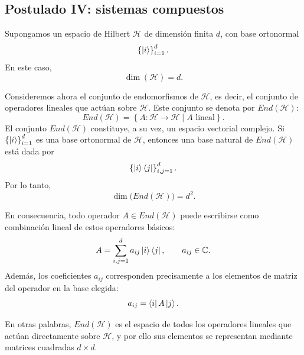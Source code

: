 \documentclass[12pt,a4paper]{article}
\theoremstyle{definition}
\theoremstyle{plain}
\theoremstyle{remark}
\newcommand{\C}{\mathbb{C}}
\newcommand{\Hil}{\mathcal{H}}
\begin{document}
\subsection{Postulado IV: sistemas compuestos}

Supongamos un espacio de Hilbert $\Hil$ de dimensión finita $d$, con base ortonormal
\begin{equation*}
    \left\{\ket{i}\right\}_{i=1}^{d}.
\end{equation*}
En este caso,
\begin{equation*}
    \dim(\Hil)=d.
\end{equation*}

Consideremos ahora el conjunto de endomorfismos de $\Hil$, es decir, el conjunto de operadores lineales que actúan sobre $\Hil$. Este conjunto se denota por $End(\Hil)$:
\begin{equation*}
    End(\Hil)=\left\{A:\Hil\to\Hil \mid A \text{ lineal}\right\}.
\end{equation*}
El conjunto $End(\Hil)$ constituye, a su vez, un espacio vectorial complejo. Si $\left\{\ket{i}\right\}_{i=1}^{d}$ es una base ortonormal de $\Hil$, entonces una base natural de $End(\Hil)$ está dada por
\begin{equation*}
    \left\{\ket{i}\bra{j}\right\}_{i,j=1}^{d}.
\end{equation*}
Por lo tanto,
\begin{equation*}
    \dim\bigl(End(\Hil)\bigr)=d^2.
\end{equation*}

En consecuencia, todo operador $A\in End(\Hil)$ puede escribirse como combinación lineal de estos operadores básicos:
\begin{equation*}
    A=\sum_{i,j=1}^{d} a_{ij}\ket{i}\bra{j},
    \qquad a_{ij}\in\C.
\end{equation*}
Además, los coeficientes $a_{ij}$ corresponden precisamente a los elementos de matriz del operador en la base elegida:
\begin{equation*}
    a_{ij}=\bra{i}A\ket{j}.
\end{equation*}

En otras palabras, $End(\Hil)$ es el espacio de todos los operadores lineales que actúan directamente sobre $\Hil$, y por ello sus elementos se representan mediante matrices cuadradas $d\times d$.
\end{document}
